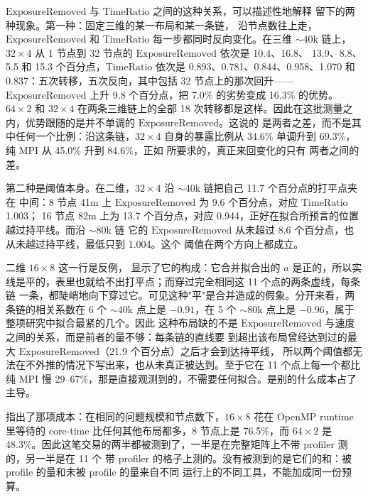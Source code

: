 \documentclass[11pt,a4paper,oneside]{report}
\begin{document}
$\mathrm{ExposureRemoved}$ 与 $\mathrm{TimeRatio}$ 之间的这种关系，可以描述性地解释
 留下的两种现象。第一种：固定三维的某一布局和某一条链，
沿节点数往上走，$\mathrm{ExposureRemoved}$ 和 $\mathrm{TimeRatio}$ 每一步都同时反向变化。在三维
$\sim$40k 链上，$32\times4$ 从 1 节点到 32 节点的 $\mathrm{ExposureRemoved}$ 依次是 10.4、16.8、
13.9、8.8、5.5 和 15.3 个百分点，$\mathrm{TimeRatio}$ 依次是 0.893、0.781、0.844、0.958、1.070
和 0.837：五次转移，五次反向，其中包括 32 节点上的那次回升——$\mathrm{ExposureRemoved}$ 上升
9.8 个百分点，把 7.0\% 的劣势变成 16.3\% 的优势。$64\times2$ 和 $32\times4$ 在两条三维链上的全部
18 次转移都是这样。因此在这批测量之内，优势跟随的是并不单调的 $\mathrm{ExposureRemoved}$。这说的
是两者之差，而不是其中任何一个比例：沿这条链，$32\times4$ 自身的暴露比例从 34.6\% 单调升到
69.3\%，纯 MPI 从 45.0\% 升到 84.6\%，正如  所要求的，真正来回变化的只有
两者之间的差。

第二种是阈值本身。在二维，$32\times4$ 沿 $\sim$40k 链把自己 11.7 个百分点的打平点夹在
中间：8 节点 41m 上 $\mathrm{ExposureRemoved}$ 为 9.6 个百分点，对应 $\mathrm{TimeRatio}$ 1.003；
16 节点 82m 上为 13.7 个百分点，对应 0.944，正好在拟合所预言的位置越过持平线。而沿 $\sim$80k 链
它的 $\mathrm{ExposureRemoved}$ 从未超过 8.6 个百分点，也从未越过持平线，最低只到 1.004。这个
阈值在两个方向上都成立。

二维 $16\times8$ 这一行是反例， 显示了它的构成：它合并拟合出的
$a$ 是正的，所以实线是平的，表里也就给不出打平点；而穿过完全相同这 11 个点的两条虚线，每条链
一条，都陡峭地向下穿过它。可见这种"平"是合并造成的假象。分开来看，两条链的相关系数在 6 个
$\sim$40k 点上是 $-0.91$，在 5 个 $\sim$80k 点上是 $-0.96$，属于整项研究中拟合最紧的几个。因此
这种布局缺的不是 $\mathrm{ExposureRemoved}$ 与速度之间的关系，而是前者的量不够：每条链的直线要
到超出该布局曾经达到过的最大 $\mathrm{ExposureRemoved}$（21.9 个百分点）之后才会到达持平线，
所以两个阈值都无法在不外推的情况下写出来，也从未真正被达到。至于它在 11 个点上每一个都比纯 MPI
慢 29--67\%，那是直接观测到的，不需要任何拟合。是别的什么成本占了主导。

 指出了那项成本：在相同的问题规模和节点数下，$16\times8$ 花在
OpenMP runtime 里等待的 core-time 比任何其他布局都多，8 节点上是 76.5\%，而 $64\times2$ 是
48.3\%。因此这笔交易的两半都被测到了，一半是在完整矩阵上不带 profiler 测的，另一半是在 11 个
带 profiler 的格子上测的。没有被测到的是它们的和：被 profile 的量和未被 profile 的量来自不同
运行上的不同工具，不能加成同一份预算。
\end{document}
